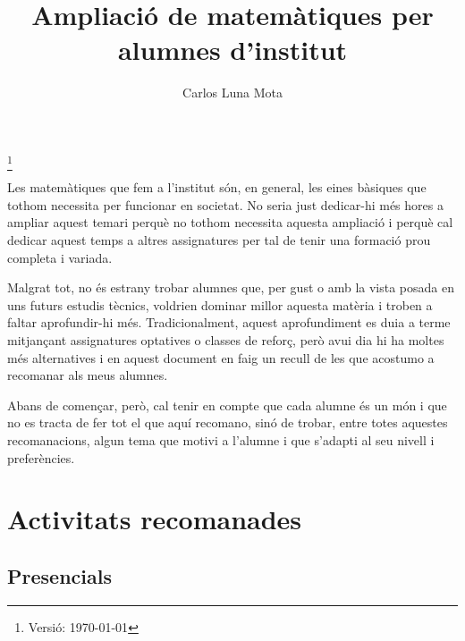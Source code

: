 \documentclass[a4paper, 12pt]{article}
\title{Ampliació de matemàtiques per alumnes d'institut}
\date{}
\author{Carlos Luna Mota}
\newcommand\blfootnote[1]{%
  \begingroup
  \renewcommand\thefootnote{}\footnote{#1}%
  \addtocounter{footnote}{-1}%
  \endgroup
}
\begin{document}
    \maketitle


    \vspace{-2ex}
    \blfootnote{Versió: \today}Les matemàtiques que fem a l'institut són, en general, les eines bàsiques que tothom necessita per funcionar en societat. No seria just dedicar-hi més hores a ampliar aquest temari perquè no tothom necessita aquesta ampliació i perquè cal dedicar aquest temps a altres assignatures per tal de tenir una formació prou completa i variada.

    Malgrat tot, no és estrany trobar alumnes que, per gust o amb la vista posada en uns futurs estudis tècnics, voldrien dominar millor aquesta matèria i troben a faltar aprofundir-hi més. Tradicionalment, aquest aprofundiment es duia a terme mitjançant assignatures optatives o classes de reforç, però avui dia hi ha moltes més alternatives i en aquest document en faig un recull de les que acostumo a recomanar als meus alumnes.

    Abans de començar, però, cal tenir en compte que cada alumne és un món i que no es tracta de fer tot el que aquí recomano, sinó de trobar, entre totes aquestes recomanacions, algun tema que motivi a l'alumne i que s'adapti al seu nivell i preferències.


    \section*{Activitats recomanades}

        \subsection*{Presencials}
\end{document}
